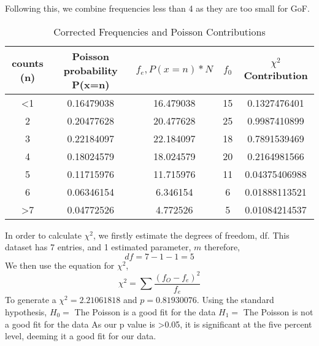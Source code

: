 \documentclass[11pt]{article}
\begin{document}
    Following this, we combine frequencies less than 4 as they are too small for GoF. 
    \begin{table}[]
        \centering
        \begin{tabular}{|c|c|c|c|c|}
         \hline
           counts (n)  & Poisson probability P(x=n) & $ f_{e}, P(x=n) * N$ & $f_{0}$ & $\chi^{2}$ Contribution\\
 \hline
            <1 & 0.16479038 & 16.479038 & 15 &0.1327476401\\
            2 & 0.20477628 & 20.477628 & 25&0.9987410899\\
            3 & 0.22184097 & 22.184097 & 18&0.7891539469\\
            4 & 0.18024579 & 18.024579 & 20&0.2164981566\\
            5 & 0.11715976 & 11.715976 & 11&0.04375406988\\
            6 & 0.06346154 & 6.346154 & 6 &0.01888113521\\
            >7 & 0.04772526 & 4.772526 & 5 &0.01084214537\\      
 \hline
        \end{tabular}
        \caption{Corrected Frequencies and Poisson Contributions}
        \label{tab:my_label}
    \end{table}
    In order to calculate $\chi^{2}$, we firstly estimate the degrees of freedom, df. This dataset has 7 entries, and 1 estimated parameter, $m$ therefore, 
    $$df = 7 - 1 - 1 = 5$$
    We then use the equation for $\chi^{2}$, 
    $$\chi^{2} = \sum{\frac{(f_{O}-f_{e})^{2}}{f_{e}}}$$
    To generate a $\chi^{2} = 2.21061818$ and $p = 0.81930076$. Using the standard hypothesis,
    \newline
    $H_{0} =$ The Poisson is a good fit for the data
    \newline
    $H_{1} =$ The Poisson is not a good fit for the data
    \newline
    As our p value is >0.05, it is significant at the 
    five percent level, deeming it a good fit for our data. 
     
\end{document}
